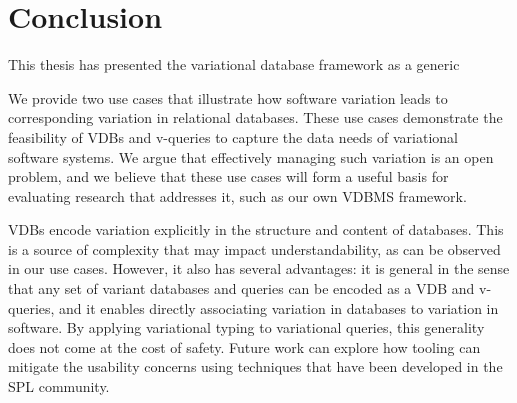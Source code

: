 \chapter{Conclusion}
\label{ch:conclusion}

This thesis has presented the variational database framework as a generic


We provide two use cases that illustrate how software variation leads to
corresponding variation in relational databases. These use cases demonstrate
the feasibility of VDBs and v-queries to capture the data needs of variational
software systems.
%
We argue that effectively managing such variation is an open problem, and we
believe that these use cases will form a useful basis for evaluating
research that addresses it, such as our own VDBMS framework.
%
%


VDBs encode variation explicitly in the structure and content of databases.
%
This is a source of complexity that may impact understandability, as can be
observed in our use cases. However, it also has several advantages: it
is general in the sense that any set of variant databases and queries can be
encoded as a VDB and v-queries, and it enables directly associating variation
in databases to variation in software.
%
By applying variational typing to variational queries, this generality does not
come at the cost of safety. Future work can explore how tooling can mitigate
the usability concerns using techniques that have been developed in the SPL
community.



